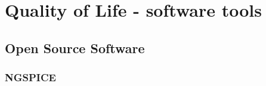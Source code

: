 \documentclass{article}
\begin{document}









\section{Quality of Life - software tools}

\subsection{Open Source Software}

\subsubsection{NGSPICE}
\end{document}
